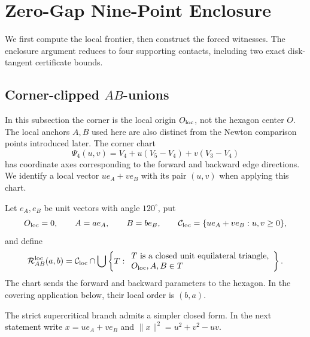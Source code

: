 \section{Zero-Gap Nine-Point Enclosure}
\label{sec:strategy4-reader}
\label{sec:zero-gap-nine-point-optimization}
\label{sec:ab-core}

We first compute the local frontier, then construct the forced witnesses.
The enclosure argument reduces to four supporting contacts, including two
exact disk-tangent certificate bounds.



\subsection{Corner-clipped $AB$-unions}

In this subsection the corner is the local origin $O_{\rm loc}$, not the
hexagon center $O$. The local anchors $A,B$ used here are also distinct
from the Newton comparison points introduced later. The corner chart
\[
 \Psi_4(u,v)=V_4+u(V_5-V_4)+v(V_3-V_4)
\]
has coordinate axes corresponding to the forward and backward edge
directions. We identify a local vector $ue_A+ve_B$ with its pair $(u,v)$
when applying this chart.

Let $e_A,e_B$ be unit vectors with angle $120^\circ$, put
\[
 O_{\rm loc}=0,\qquad A=ae_A,\qquad B=be_B,
 \qquad
 \mathcal C_{\rm loc}=\{ue_A+ve_B:u,v\ge0\},
\]
and define
\begin{equation}
 \mathcal R_{AB}^{\rm loc}(a,b)=
 \mathcal C_{\rm loc}\cap\bigcup\left\{T:
 \begin{array}{l}
 T\text{ is a closed unit equilateral triangle},\\
 O_{\rm loc},A,B\in T
 \end{array}\right\}.
 \label{eq:ab-union}
\end{equation}
The chart sends the forward and backward parameters to the hexagon.
In the covering application below, their local order is $(b,a)$.

The strict supercritical branch admits a simpler closed form.  In the next
statement write $x=ue_A+ve_B$ and
$\lVert x\rVert^2=u^2+v^2-uv$.

